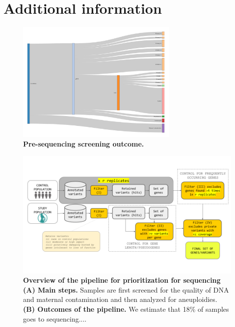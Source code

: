 \documentclass[fleqn,10pt]{wlscirep}
\begin{document}
\section*{Additional information}

\newpage
%
\FloatBarrier

\begin{figure}[h]
\centering
\includegraphics[width=0.7\textwidth]{fig/IbelieveIcanFly.pdf}
\caption{\textbf{Pre-sequencing screening outcome.} }
\label{fig:presequencing}
\end{figure}

\begin{figure}[ht]
\centering
\includegraphics[width=\linewidth]{fig/pipeonly.png}
\caption{\textbf{Overview of the pipeline for prioritization for sequencing (A) Main steps.} Samples are first screened for the quality of DNA and maternal contamination and then analyzed for aneuploidies. \textbf{(B) Outcomes of the pipeline.} We estimate that 18\% of samples goes to sequencing....} 
\label{fig:pipeline}
\end{figure}
\end{document}
